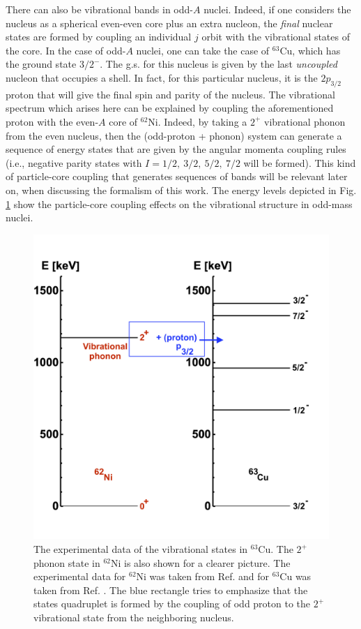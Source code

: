 There can also be vibrational bands in odd-$A$ nuclei. Indeed, if one considers the nucleus as a spherical even-even core plus an extra nucleon, the \emph{final} nuclear states are formed by coupling an individual $j$ orbit with the vibrational states of the core.
In the case of odd-$A$ nuclei, one can take the case of $^{63}$Cu, which has the ground state $3/2^{-}$. The g.s. for this nucleus is given by the last \emph{uncoupled} nucleon that occupies a shell. In fact, for this particular nucleus, it is the $2p_{3/2}$ proton that will give the final spin and parity of the nucleus. The vibrational spectrum which arises here can be explained by coupling the aforementioned proton with the even-$A$ core of $^{62}$Ni. Indeed, by taking a $2^+$ vibrational phonon from the even nucleus, then the (odd-proton + phonon) system can generate a sequence of energy states that are given by the angular momenta coupling rules (i.e., negative parity states with $I=1/2,\ 3/2,\ 5/2,\ 7/2$ will be formed).
This kind of particle-core coupling that generates sequences of bands will be relevant later on, when discussing the formalism of this work.
The energy levels depicted in Fig. \ref{energy-levels-63Cu-virbational-band} show the particle-core coupling effects on the vibrational structure in odd-mass nuclei.

\begin{figure}
    \centering
    \includegraphics[scale=0.155]{Chapters/Figures/63Cu_vib_experimental.png}
    \caption{The experimental data of the vibrational states in $^{63}$Cu. The $2^+$ phonon state in $^{62}$Ni is also shown for a clearer picture. The experimental data for $^{62}$Ni was taken from Ref. \cite{nichols2012nuclear} and for $^{63}$Cu was taken from Ref. \cite{erjun2001nuclear}. The blue rectangle tries to emphasize that the states quadruplet is formed by the coupling of odd proton to the $2^+$ vibrational state from the neighboring nucleus.}
    \label{energy-levels-63Cu-virbational-band}
\end{figure}

